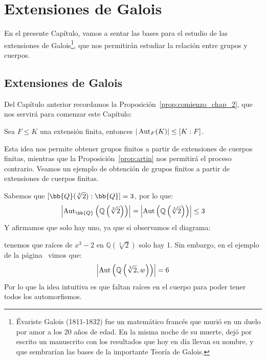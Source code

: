 \chapter{Extensiones de Galois}

En el presente Capítulo, vamos a sentar las bases para el estudio de las extensiones de Galois\footnote{Évariste Galois (1811-1832) fue un matemático francés que murió en un duelo por amor a los 20 años de edad. En la misma noche de su muerte, dejó por escrito un manuscrito con los resultados que hoy en día llevan su nombre, y que sembrarían las bases de la importante Teoría de Galois.}, que nos permitirán estudiar la relación entre grupos y cuerpos.


\section{Extensiones de Galois}

Del Capítulo anterior recordamos la Proposición~\ref{prop:comienzo_chap_2}, que nos servirá para comenzar este Capítulo:

\begin{center}
    Sea $F\leq K$ una extensión finita, entonces $|\operatorname{Aut}_F(K)| \leq [K:F]$.
\end{center}


Esta idea nos permite obtener grupos finitos a partir de extensiones de cuerpos finitas, mientras que la Proposición~\ref{prop:artin} nos permitirá el proceso contrario. Veamos un ejemplo de obtención de grupos finitos a partir de extensiones de cuerpos finitas.
\begin{ejemplo}
    Sabemos que $[\bb{Q}(\sqrt[3]{2}):\bb{Q}] = 3$, por lo que:
    \begin{equation*}
        \left|\Aut_{\bb{Q}}\left(\mathbb{Q}\left(\sqrt[3]{2}\right)\right)\right| = \left|\Aut\left(\mathbb{Q}\left(\sqrt[3]{2}\right)\right)\right| \leq 3
    \end{equation*}
    Y afirmamos que solo hay uno, ya que si observamos el diagrama:
    \begin{figure}[H]
        \centering
    \end{figure}
    \noindent
    tenemos que raíces de $x^3-2$ en $\mathbb{Q}\left(\sqrt[3]{2}\right)$ solo hay 1. Sin embargo, en el ejemplo de la página~\pageref{ejemplo:aut_sqrt3_2} vimos que:
    \begin{equation*}
        \left|\operatorname{Aut}\left(\mathbb{Q}\left(\sqrt[3]{2},w\right)\right)\right| = 6
    \end{equation*}
    Por lo que la idea intuitiva es que faltan raíces en el cuerpo para poder tener todos los automorfismos.
\end{ejemplo}

